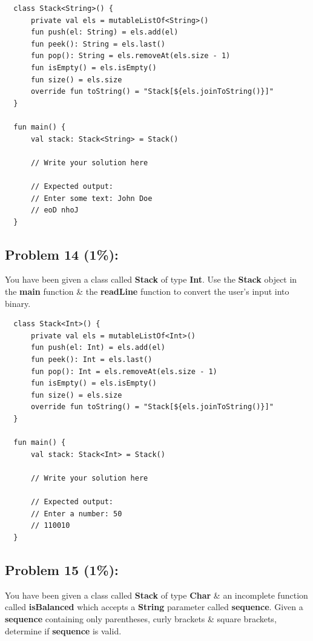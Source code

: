 \documentclass{article}
\begin{document}
\begin{verbatim}
  class Stack<String>() {
      private val els = mutableListOf<String>()
      fun push(el: String) = els.add(el)
      fun peek(): String = els.last()
      fun pop(): String = els.removeAt(els.size - 1)
      fun isEmpty() = els.isEmpty()
      fun size() = els.size
      override fun toString() = "Stack[${els.joinToString()}]"
  }

  fun main() {
      val stack: Stack<String> = Stack()

      // Write your solution here

      // Expected output:
      // Enter some text: John Doe
      // eoD nhoJ
  }
\end{verbatim}

\subsection*{Problem 14 (1\%):}
You have been given a class called \textbf{Stack} of type \textbf{Int}. Use the \textbf{Stack} object in the \textbf{main} function \& the \textbf{readLine} function to convert the user's input into binary.

\begin{verbatim}
  class Stack<Int>() {
      private val els = mutableListOf<Int>()
      fun push(el: Int) = els.add(el)
      fun peek(): Int = els.last()
      fun pop(): Int = els.removeAt(els.size - 1)
      fun isEmpty() = els.isEmpty()
      fun size() = els.size
      override fun toString() = "Stack[${els.joinToString()}]"
  }

  fun main() {
      val stack: Stack<Int> = Stack()

      // Write your solution here

      // Expected output:
      // Enter a number: 50
      // 110010
  }
\end{verbatim}

\subsection*{Problem 15 (1\%):}
You have been given a class called \textbf{Stack} of type \textbf{Char} \& an incomplete function called \textbf{isBalanced} which accepts a \textbf{String} parameter called \textbf{sequence}. Given a \textbf{sequence} containing only parentheses, curly brackets \& square brackets, determine if \textbf{sequence} is valid.
\end{document}
